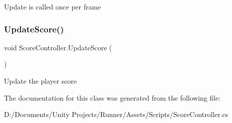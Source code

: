 Update is called once per frame \mbox{\label{class_score_controller_a7f3cae72611c80661f9e9b0bf300fe34}} 
\subsubsection{\texorpdfstring{Update\+Score()}{UpdateScore()}}
{\footnotesize\ttfamily void Score\+Controller.\+Update\+Score (\begin{DoxyParamCaption}{ }\end{DoxyParamCaption})\hspace{0.3cm}{\ttfamily [private]}}

Update the player score 

The documentation for this class was generated from the following file\+:\begin{DoxyCompactItemize}
\item 
D\+:/\+Documents/\+Unity Projects/\+Runner/\+Assets/\+Scripts/Score\+Controller.\+cs\end{DoxyCompactItemize}
